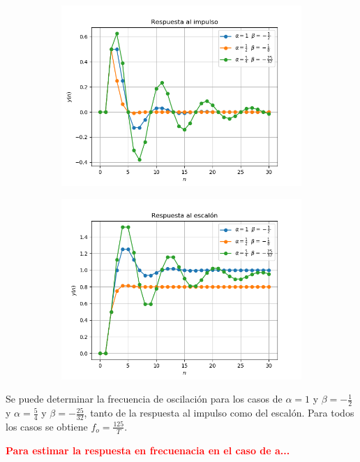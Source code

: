 \begin{figure}[H]
\centering
\begin{subfigure}{.49\textwidth}
\centering
	\includegraphics[width=\textwidth]{Imagenes/9-impulso.png}
\end{subfigure}
\begin{subfigure}{.49\textwidth}
\centering
	\includegraphics[width=\textwidth]{Imagenes/9-escalon.png}
\end{subfigure}
\end{figure}

Se puede determinar la frecuencia de oscilación para los casos de $\alpha = 1$ y $\beta = -\frac{1}{2}$ y $\alpha = \frac{5}{4}$ y $\beta = -\frac{25}{32}$, tanto de la respuesta al impulso como del escalón. Para todos los casos se obtiene $f_o = \frac{125}{T}$.
\begin{center}
	\textcolor{red}{\textbf{Para estimar la respuesta en frecuenacia en el caso de a...}}
\end{center}

